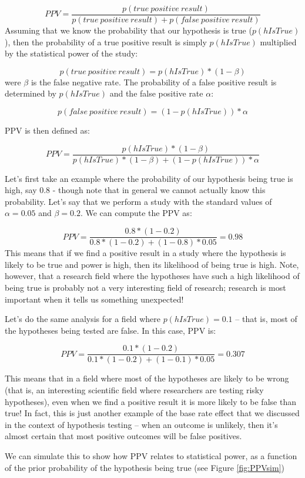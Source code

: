 \documentclass[
  12pt,
]{book}
\begin{document}
\[
PPV = \frac{p(true\ positive\ result)}{p(true\ positive\ result) + p(false\ positive\ result)}
\]
Assuming that we know the probability that our hypothesis is true (\(p(hIsTrue)\)), then the probability of a true positive result is simply \(p(hIsTrue)\) multiplied by the statistical power of the study:

\[
p(true\ positive\ result) = p(hIsTrue) * (1 - \beta)
\]
were \(\beta\) is the false negative rate. The probability of a false positive result is determined by \(p(hIsTrue)\) and the false positive rate \(\alpha\):

\[
p(false\ positive\ result) = (1 - p(hIsTrue)) * \alpha
\]

PPV is then defined as:

\[
PPV = \frac{p(hIsTrue) * (1 - \beta)}{p(hIsTrue) * (1 - \beta) + (1 - p(hIsTrue)) * \alpha}
\]

Let's first take an example where the probability of our hypothesis being true is high, say 0.8 - though note that in general we cannot actually know this probability. Let's say that we perform a study with the standard values of \(\alpha=0.05\) and \(\beta=0.2\). We can compute the PPV as:

\[
PPV = \frac{0.8 * (1 - 0.2)}{0.8 * (1 - 0.2) + (1 - 0.8) * 0.05} = 0.98
\]
This means that if we find a positive result in a study where the hypothesis is likely to be true and power is high, then its likelihood of being true is high. Note, however, that a research field where the hypotheses have such a high likelihood of being true is probably not a very interesting field of research; research is most important when it tells us something unexpected!

Let's do the same analysis for a field where \(p(hIsTrue)=0.1\) -- that is, most of the hypotheses being tested are false. In this case, PPV is:

\[
PPV = \frac{0.1 * (1 - 0.2)}{0.1 * (1 - 0.2) + (1 - 0.1) * 0.05} = 0.307
\]

This means that in a field where most of the hypotheses are likely to be wrong (that is, an interesting scientific field where researchers are testing risky hypotheses), even when we find a positive result it is more likely to be false than true! In fact, this is just another example of the base rate effect that we discussed in the context of hypothesis testing -- when an outcome is unlikely, then it's almost certain that most positive outcomes will be false positives.

We can simulate this to show how PPV relates to statistical power, as a function of the prior probability of the hypothesis being true (see Figure \ref{fig:PPVsim})
\end{document}
